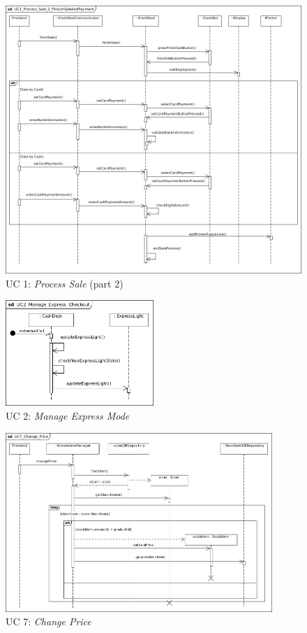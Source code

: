 			\begin{figure}[!h]
				\centering
				\includegraphics[width = 1\textwidth]{img/UC1_Process_Sale_2_FinishSaleAndPayment.jpg}
				\caption{UC 1: \textit{Process Sale} (part 2)}
				\label{MS_UC1_2}
			\end{figure}
			
			\begin{figure}[!h]
				\centering
				\includegraphics[width = 0.5\textwidth]{img/UC2_Manage_Express_Checkout.jpg}
				\caption{UC 2: \textit{Manage Express Mode}}
				\label{MS_UC2}
			\end{figure}
			
			\begin{figure}[!h]
				\centering
				\includegraphics[width = 0.9\textwidth]{img/UC7_Change_Price.jpg}
				\caption{UC 7: \textit{Change Price}}
				\label{MS_UC7}
			\end{figure}
			
